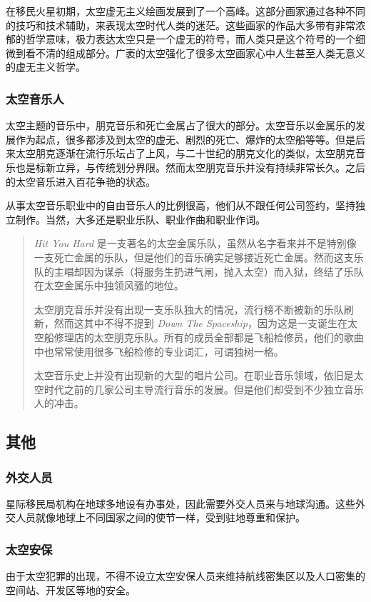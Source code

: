 \documentclass[letterpaper,10pt]{sphinxmanual}
\begin{document}
在移民火星初期，太空虚无主义绘画发展到了一个高峰。这部分画家通过各种不同的技巧和技术辅助，来表现太空时代人类的迷茫。这些画家的作品大多带有非常浓郁的哲学意味，极力表达太空只是一个虚无的符号，而人类只是这个符号的一个细微到看不清的组成部分。广袤的太空强化了很多太空画家心中人生甚至人类无意义的虚无主义哲学。


\subsubsection{太空音乐人}
\label{profession:id44}
太空主题的音乐中，朋克音乐和死亡金属占了很大的部分。太空音乐以金属乐的发展作为起点，很多都涉及到太空的虚无、剧烈的死亡、爆炸的太空船等等。但是后来太空朋克逐渐在流行乐坛占了上风，与二十世纪的朋克文化的类似，太空朋克音乐也是标新立异，与传统划分界限。然而太空朋克音乐并没有持续非常长久。之后的太空音乐进入百花争艳的状态。

从事太空音乐职业中的自由音乐人的比例很高，他们从不跟任何公司签约，坚持独立制作。当然，大多还是职业乐队、职业作曲和职业作词。
\begin{quote}

\emph{Hit You Hard} 是一支著名的太空金属乐队，虽然从名字看来并不是特别像一支死亡金属的乐队，但是他们的音乐确实足够接近死亡金属。然而这支乐队的主唱却因为谋杀（将服务生扔进气闸，抛入太空）而入狱，终结了乐队在太空金属乐中独领风骚的地位。

太空朋克音乐并没有出现一支乐队独大的情况，流行榜不断被新的乐队刷新，然而这其中不得不提到 \emph{Down The Spaceship}，因为这是一支诞生在太空船修理店的太空朋克乐队。所有的成员全部都是飞船检修员，他们的歌曲中也常常使用很多飞船检修的专业词汇，可谓独树一格。

太空音乐史上并没有出现新的大型的唱片公司。在职业音乐领域，依旧是太空时代之前的几家公司主导流行音乐的发展。但是他们却受到不少独立音乐人的冲击。
\end{quote}


\subsection{其他}
\label{profession:id45}

\subsubsection{外交人员}
\label{profession:id46}
星际移民局机构在地球多地设有办事处，因此需要外交人员来与地球沟通。这些外交人员就像地球上不同国家之间的使节一样，受到驻地尊重和保护。


\subsubsection{太空安保}
\label{profession:id47}
由于太空犯罪的出现，不得不设立太空安保人员来维持航线密集区以及人口密集的空间站、开发区等地的安全。
\end{document}
